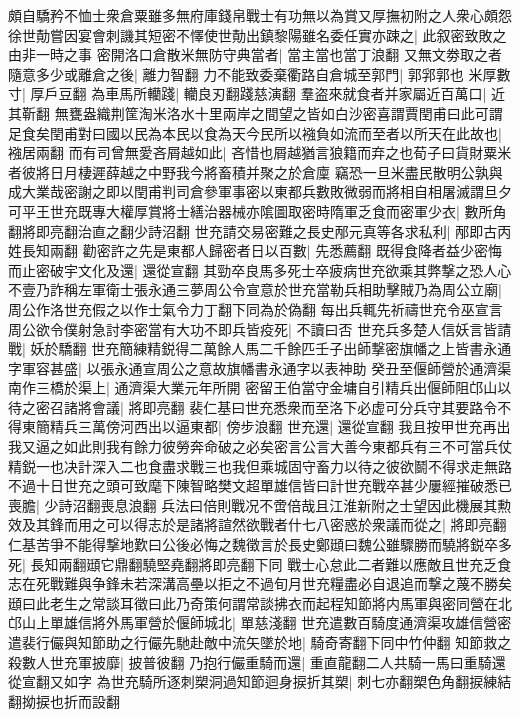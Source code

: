 頗自驕矜不恤士衆倉粟雖多無府庫錢帛戰士有功無以為賞又厚撫初附之人衆心頗怨徐世勣嘗因宴會刺譏其短密不懌使世勣出鎮黎陽雖名委任實亦踈之|{
	此叙密致敗之由非一時之事}
密開洛口倉散米無防守典當者|{
	當主當也當丁浪翻}
又無文劵取之者隨意多少或離倉之後|{
	離力智翻}
力不能致委棄衢路自倉城至郭門|{
	郭郛郭也}
米厚數寸|{
	厚戶豆翻}
為車馬所轥踐|{
	轥良刃翻踐慈演翻}
羣盗來就食者并家屬近百萬口|{
	近其靳翻}
無甕盎織荆筐淘米洛水十里兩岸之間望之皆如白沙密喜謂賈閏甫曰此可謂足食矣閏甫對曰國以民為本民以食為天今民所以襁負如流而至者以所天在此故也|{
	襁居兩翻}
而有司曾無愛吝屑越如此|{
	吝惜也屑越猶言狼籍而弃之也荀子曰貨財粟米者彼將日月棲遲薛越之中野我今將畜積并聚之於倉廩}
竊恐一旦米盡民散明公孰與成大業哉密謝之即以閏甫判司倉參軍事密以東都兵數敗微弱而將相自相屠滅謂旦夕可平王世充既專大權厚賞將士繕治器械亦隂圖取密時隋軍乏食而密軍少衣|{
	數所角翻將即亮翻治直之翻少詩沼翻}
世充請交易密難之長史邴元真等各求私利|{
	邴即古丙姓長知兩翻}
勸密許之先是東都人歸密者日以百數|{
	先悉薦翻}
既得食降者益少密悔而止密破宇文化及還|{
	還從宣翻}
其勁卒良馬多死士卒疲病世充欲乘其弊撃之恐人心不壹乃詐稱左軍衛士張永通三夢周公令宣意於世充當勒兵相助擊賊乃為周公立廟|{
	周公作洛世充假之以作士氣令力丁翻下同為於偽翻}
每出兵輒先祈禱世充令巫宣言周公欲令僕射急討李密當有大功不即兵皆疫死|{
	不讀曰否}
世充兵多楚人信妖言皆請戰|{
	妖於驕翻}
世充簡練精鋭得二萬餘人馬二千餘匹壬子出師撃密旗幡之上皆書永通字軍容甚盛|{
	以張永通宣周公之意故旗幡書永通字以表神助}
癸丑至偃師營於通濟渠南作三橋於渠上|{
	通濟渠大業元年所開}
密留王伯當守金墉自引精兵出偃師阻邙山以待之密召諸將會議|{
	將即亮翻}
裴仁基曰世充悉衆而至洛下必虚可分兵守其要路令不得東簡精兵三萬傍河西出以逼東都|{
	傍步浪翻}
世充還|{
	還從宣翻}
我且按甲世充再出我又逼之如此則我有餘力彼勞奔命破之必矣密言公言大善今東都兵有三不可當兵仗精鋭一也决計深入二也食盡求戰三也我但乘城固守畜力以待之彼欲鬬不得求走無路不過十日世充之頭可致麾下陳智略樊文超單雄信皆曰計世充戰卒甚少屢經摧破悉已喪膽|{
	少詩沼翻喪息浪翻}
兵法曰倍則戰况不啻倍哉且江淮新附之士望因此機展其勲效及其鋒而用之可以得志於是諸將諠然欲戰者什七八密惑於衆議而從之|{
	將即亮翻}
仁基苦爭不能得撃地歎曰公後必悔之魏徵言於長史鄭頲曰魏公雖驟勝而驍將鋭卒多死|{
	長知兩翻頲它鼎翻驍堅堯翻將即亮翻下同}
戰士心怠此二者難以應敵且世充乏食志在死戰難與争鋒未若深溝高壘以拒之不過旬月世充糧盡必自退追而撃之蔑不勝矣頲曰此老生之常談耳徵曰此乃奇策何謂常談拂衣而起程知節將内馬軍與密同營在北邙山上單雄信將外馬軍營於偃師城北|{
	單慈淺翻}
世充遣數百騎度通濟渠攻雄信營密遣裴行儼與知節助之行儼先馳赴敵中流矢墜於地|{
	騎奇寄翻下同中竹仲翻}
知節救之殺數人世充軍披靡|{
	披普彼翻}
乃抱行儼重騎而還|{
	重直龍翻二人共騎一馬曰重騎還從宣翻又如字}
為世充騎所逐刺槊洞過知節迴身捩折其槊|{
	刺七亦翻槊色角翻捩練結翻拗捩也折而設翻}
